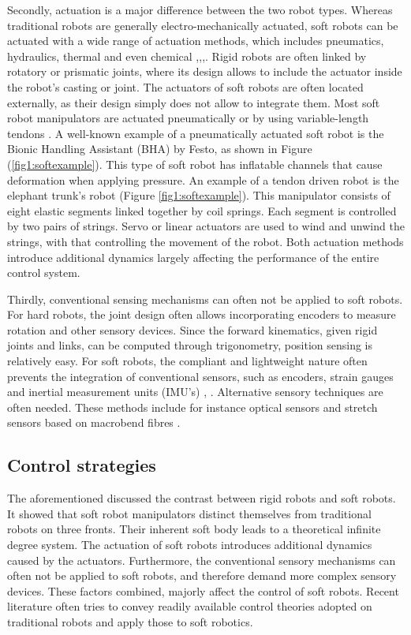 Secondly, actuation is a major difference between the two robot types. Whereas traditional robots are generally electro-mechanically actuated, soft robots can be actuated with a wide range of actuation methods, which includes pneumatics, hydraulics, thermal and even chemical \cite{BHA},\cite{marchese2014},\cite{kang2019programmable},\cite{shepherd2013using}. Rigid robots are often linked by rotatory or prismatic joints, where its design allows to include the actuator inside the robot's casting or joint. The actuators of soft robots are often located externally, as their design simply does not allow to integrate them. Most soft robot manipulators are actuated pneumatically or by using variable-length tendons \cite{Rus2015}. A well-known example of a pneumatically actuated soft robot is the Bionic Handling Assistant (BHA) by Festo, as shown in Figure (\ref{fig1:softexample}). This type of soft robot has inflatable channels that cause deformation when applying pressure. An example of a tendon driven robot is the elephant trunk's robot \cite{cieslak1999elephant} (Figure \ref{fig1:softexample}). This manipulator consists of eight elastic segments linked together by coil springs. Each segment is controlled by two pairs of strings. Servo or linear actuators are used to wind and unwind the strings, with that controlling the movement of the robot. Both actuation methods introduce additional dynamics largely affecting the performance of the entire control system. 

Thirdly, conventional sensing mechanisms can often not be applied to soft robots. For hard robots, the joint design often allows incorporating encoders to measure rotation and other sensory devices. Since the forward kinematics, given rigid joints and links, can be computed through trigonometry, position sensing is relatively easy. For soft robots, the compliant and lightweight nature often prevents the integration of conventional sensors, such as encoders, strain gauges and inertial measurement units (IMU's) \cite{Rus2015}, \cite{Lee2017}. Alternative sensory techniques are often needed. These methods include for instance optical sensors and stretch sensors based on macrobend fibres \cite{Sareh2015}.

\subsection*{Control strategies}

The aforementioned discussed the contrast between rigid robots and soft robots. It showed that soft robot manipulators distinct themselves from traditional robots on three fronts. Their inherent soft body leads to a theoretical infinite degree system. The actuation of soft robots introduces additional dynamics caused by the actuators. Furthermore, the conventional sensory mechanisms can often not be applied to soft robots, and therefore demand more complex sensory devices. These factors combined, majorly affect the control of soft robots. Recent literature often tries to convey readily available control theories adopted on traditional robots and apply those to soft robotics.

